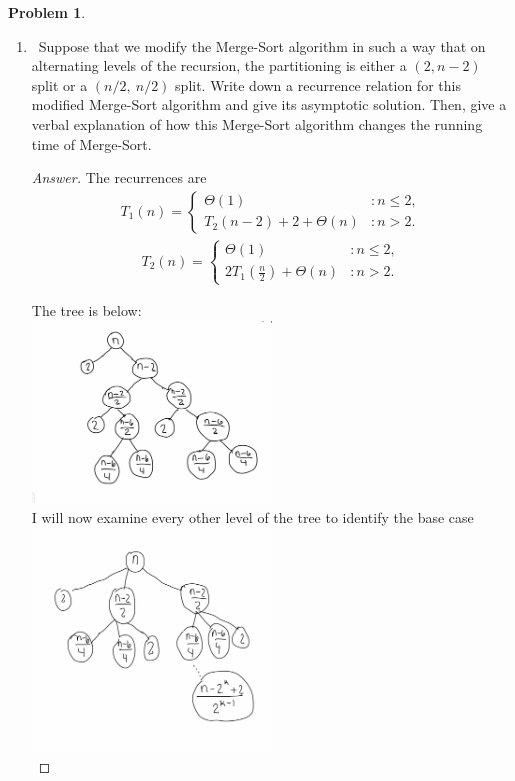 \documentclass[11pt]{article}
\theoremstyle{definition}
\theoremstyle{definition}
\newtheorem{required}{Problem}
\theoremstyle{definition}
\begin{document}
\begin{required}
\begin{enumerate}[label=(\alph*)]
\begin{proof}[Answer]
Thus we have that $T(n) \in O(nlog_5n)$
\end{proof}


\newpage

\item \label{(c)}~Suppose that we modify the Merge-Sort algorithm in such a way that on alternating levels of the recursion, the partitioning is either a $(2, n-2)$ split or a $(n/2,~n/2)$ split. Write down a recurrence relation for this modified Merge-Sort algorithm and give its asymptotic solution. Then, give a verbal explanation of how this Merge-Sort algorithm changes the running time of Merge-Sort.


\begin{proof}[Answer]
The recurrences are \\
\begin{align*}
T_1(n) = \begin{cases}
\Theta(1) & : n \leq 2, \\
T_2(n-2) + 2+ \Theta(n) & : n > 2.
\end{cases}
\end{align*}
\begin{align*}
T_2(n) = \begin{cases}
\Theta(1) & : n \leq 2, \\
2T_1(\frac{n}{2}) + \Theta(n) & : n > 2.
\end{cases}
\end{align*}

The tree is below: \\
\includegraphics[width=0.5\textwidth]{1c1Hw6} \\

I will now examine every other level of the tree to identify the base case \\
\includegraphics[width=0.5\textwidth]{1c2Hw6} \\



\end{proof}
\end{enumerate}
\end{required}
\end{document}
